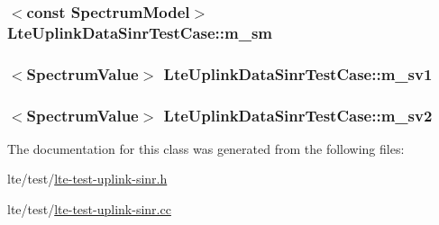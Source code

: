 \subsubsection[{\texorpdfstring{m\+\_\+sm}{m_sm}}]{$<$const {\bf Spectrum\+Model}$>$ Lte\+Uplink\+Data\+Sinr\+Test\+Case\+::m\+\_\+sm\hspace{0.3cm}{\ttfamily [private]}}\hypertarget{classLteUplinkDataSinrTestCase_a7c731b1f130bbe8132c3e86692cff054}{}\label{classLteUplinkDataSinrTestCase_a7c731b1f130bbe8132c3e86692cff054}
\subsubsection[{\texorpdfstring{m\+\_\+sv1}{m_sv1}}]{$<${\bf Spectrum\+Value}$>$ Lte\+Uplink\+Data\+Sinr\+Test\+Case\+::m\+\_\+sv1\hspace{0.3cm}{\ttfamily [private]}}\hypertarget{classLteUplinkDataSinrTestCase_a0b51a5eadfb0d59b4383934f650589f0}{}\label{classLteUplinkDataSinrTestCase_a0b51a5eadfb0d59b4383934f650589f0}
\subsubsection[{\texorpdfstring{m\+\_\+sv2}{m_sv2}}]{$<${\bf Spectrum\+Value}$>$ Lte\+Uplink\+Data\+Sinr\+Test\+Case\+::m\+\_\+sv2\hspace{0.3cm}{\ttfamily [private]}}\hypertarget{classLteUplinkDataSinrTestCase_a4978e3778e5c5a822c1c88575421e2a8}{}\label{classLteUplinkDataSinrTestCase_a4978e3778e5c5a822c1c88575421e2a8}


The documentation for this class was generated from the following files\+:\begin{DoxyCompactItemize}
\item 
lte/test/\hyperlink{lte-test-uplink-sinr_8h}{lte-\/test-\/uplink-\/sinr.\+h}\item 
lte/test/\hyperlink{lte-test-uplink-sinr_8cc}{lte-\/test-\/uplink-\/sinr.\+cc}\end{DoxyCompactItemize}
